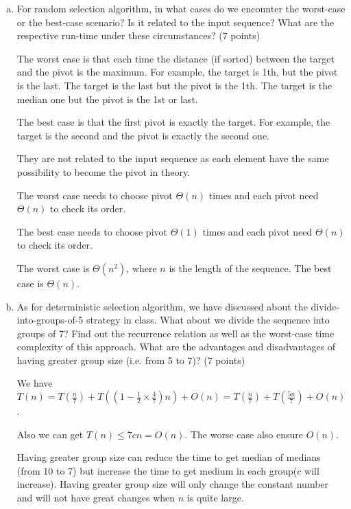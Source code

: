 \documentclass[11pt]{exam}
\begin{document}
\begin{enumerate}[(a)] \label{prb:tiger_code}

    \item For random selection algorithm, in what cases do we encounter the worst-case or the best-case scenario? Is it related to the input sequence? What are the respective run-time under these circumstances? (7 points)

          \begin{solution}
              The worst case is that each time the distance (if sorted) between the target and the pivot is the maximum.
              For example, the target is 1th, but the pivot is the last. The target is the last but the pivot is the 1th. The target is the median one but the pivot is the 1st or last.

              The best case is that the first pivot is exactly the target. For example, the target is the second and the pivot is exactly the second one.

              They are not related to the input sequence as each element have the same possibility to become the pivot in theory.

              The worst case needs to choose pivot $\Theta(n)$ times and each pivot need $\Theta(n)$ to check its order.

              The best case needs to choose pivot $\Theta(1)$ times and each pivot need $\Theta(n)$ to check its order.

              The worst case is $\Theta(n^2)$, where $n$ is the length of the sequence. The best case is $\Theta(n)$.

          \end{solution}

    \item As for deterministic selection algorithm, we have discussed about the divide-into-groups-of-5 strategy in class. What about we divide the sequence into groups of 7? Find out the recurrence relation as well as the worst-case time complexity of this approach. What are the advantages and disadvantages of having greater group size (i.e. from 5 to 7)? (7 points)

          \begin{solution}
              We have $T(n) = T(\frac{n}{7})+T((1 - \frac{1}{2} \times \frac{4}{7})n) + O(n) = T(\frac{n}{7})+T(\frac{5n}{7}) + O(n)$.

              Also we can get $T(n) \leq 7cn = O(n)$.
              The worse case also ensure $O(n)$.

              Having greater group size can reduce the time to get median of medians (from 10 to 7) but increase the time to get medium in each group($c$ will increase).
              Having greater group size will only change the constant number and will not have great changes when $n$ is quite large.

          \end{solution}

\end{enumerate}
\end{document}
